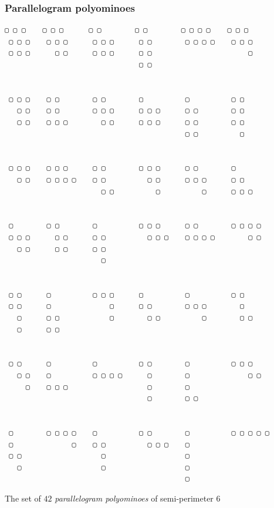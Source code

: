 \documentclass[9pt]{beamer}
\begin{document}
\begin{frame}[fragile]
\frametitle{Parallelogram polyominoes}
\begin{Verbatim}[baselinestretch=0.5, fontsize=\footnotesize]
 ▢ ▢ ▢    ▢ ▢ ▢      ▢ ▢        ▢ ▢        ▢ ▢ ▢ ▢    ▢ ▢ ▢
 ▢ ▢ ▢    ▢ ▢ ▢      ▢ ▢ ▢      ▢ ▢        ▢ ▢ ▢ ▢    ▢ ▢ ▢
 ▢ ▢ ▢      ▢ ▢      ▢ ▢ ▢      ▢ ▢                       ▢
                                ▢ ▢


 ▢ ▢ ▢    ▢ ▢        ▢ ▢        ▢          ▢          ▢ ▢
   ▢ ▢    ▢ ▢        ▢ ▢ ▢      ▢ ▢ ▢      ▢ ▢        ▢ ▢
   ▢ ▢    ▢ ▢ ▢        ▢ ▢      ▢ ▢ ▢      ▢ ▢        ▢ ▢
                                           ▢ ▢          ▢


 ▢ ▢ ▢    ▢ ▢ ▢      ▢ ▢        ▢ ▢ ▢      ▢ ▢        ▢
   ▢ ▢    ▢ ▢ ▢ ▢    ▢ ▢          ▢ ▢      ▢ ▢ ▢      ▢ ▢
                       ▢ ▢          ▢          ▢      ▢ ▢ ▢


 ▢        ▢ ▢        ▢          ▢ ▢ ▢      ▢ ▢        ▢ ▢ ▢ ▢
 ▢ ▢ ▢      ▢ ▢      ▢ ▢          ▢ ▢ ▢    ▢ ▢ ▢ ▢        ▢ ▢
   ▢ ▢      ▢ ▢      ▢ ▢
                       ▢


 ▢ ▢      ▢          ▢ ▢ ▢      ▢          ▢          ▢ ▢
 ▢ ▢      ▢              ▢      ▢ ▢        ▢ ▢ ▢        ▢
   ▢      ▢ ▢            ▢        ▢ ▢          ▢        ▢ ▢
   ▢      ▢ ▢


 ▢ ▢      ▢          ▢          ▢ ▢        ▢          ▢ ▢ ▢
   ▢ ▢    ▢          ▢ ▢ ▢ ▢      ▢        ▢              ▢ ▢
     ▢    ▢ ▢ ▢                   ▢        ▢
                                  ▢        ▢ ▢


 ▢        ▢ ▢ ▢ ▢    ▢          ▢ ▢        ▢          ▢ ▢ ▢ ▢ ▢
 ▢              ▢    ▢ ▢          ▢ ▢ ▢    ▢
 ▢ ▢                   ▢                   ▢
   ▢                   ▢                   ▢
                                           ▢
\end{Verbatim}
The set of $42$ \textit{parallelogram polyominoes} of semi-perimeter $6$
\end{frame}
\end{document}
